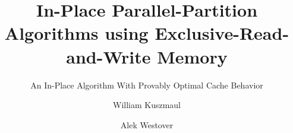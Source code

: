 \documentclass[sigplan, 10pt, nonacm]{acmart}
\theoremstyle{remark}
\theoremstyle{remark}
\begin{document}

 



\title[]{In-Place Parallel-Partition Algorithms using Exclusive-Read-and-Write Memory}
\subtitle{An In-Place Algorithm With Provably Optimal Cache Behavior}

\author{William Kuszmaul}


\author{Alek Westover}





%
%


\end{document}
